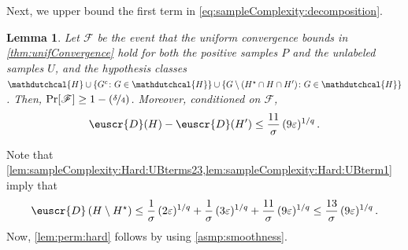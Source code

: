 \documentclass[11pt]{article}
\theoremstyle{plain}
\newtheorem{lemma}[theorem]{Lemma}
\theoremstyle{definition}
\theoremstyle{remark}
\newcommand{\inbrace}[1]{\left\{#1\right\}}
\newcommand{\inparen}[1]{\left(#1\right)}
\newcommand{\evF}{\ensuremath{\mathscr{F}}}
\newcommand{\nfrac}[2]{\nicefrac{#1}{#2}}
\newcommand{\eps}{\varepsilon}
\newcommand{\customcal}[1]{\euscr{#1}}
\newcommand{\cD}{\customcal{D}}
\newcommand{\hypo}[1]{\mathdutchcal{#1}}
\newcommand{\hyH}{\hypo{H}}
\newcommand{\optset}{{H^\star}}
\newcommand{\cDgiven}{\cD}
\begin{document}
            Next, we upper bound the first term in \cref{eq:sampleComplexity:decomposition}.
            \begin{lemma}
                \label{lem:sampleComplexity:Hard:UBterm1}
                Let $\evF$ be the event that the uniform convergence bounds in \cref{thm:unifConvergence} hold for both the positive samples $P$ and the unlabeled samples $U$, and the hypothesis classes $\hyH\cup\inbrace{G^c\colon G\in \hyH}\cup \inbrace{G\setminus (\optset \cap H\cap H')\colon G\in \hyH}$.
                Then, $\Pr[\evF]\geq 1-(\nfrac{\delta}{4})$.
                Moreover, conditioned on $\evF$, 
                \[
                    \cD(H) - \cD(H')
                    \leq \frac{11}{\sigma} \, (9\eps )^{1/q}
                    \,.
                \]
            \end{lemma}
            Note that \cref{lem:sampleComplexity:Hard:UBterms23,lem:sampleComplexity:Hard:UBterm1} imply that 
            \[
                \cDgiven\inparen{H\setminus \optset}
                    \leq 
                    \frac{1}{\sigma}\,(2\eps)^{1/q}
                    + \frac{1}{\sigma}\,(3\eps)^{1/q}
                    + \frac{11}{\sigma} \, (9\eps )^{1/q}
                    \leq \frac{13}{\sigma} \, (9\eps )^{1/q}\,.
            \]
            Now, \cref{lem:perm:hard} follows by using \cref{asmp:smoothness}.
\end{document}
